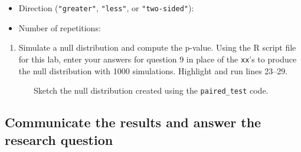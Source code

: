 \documentclass[
]{report}
\newenvironment{Shaded}{\begin{snugshade}}{\end{snugshade}}
\newcommand{\AttributeTok}[1]{\textcolor[rgb]{0.13,0.29,0.53}{#1}}
\newcommand{\CommentTok}[1]{\textcolor[rgb]{0.56,0.35,0.01}{\textit{#1}}}
\newcommand{\DecValTok}[1]{\textcolor[rgb]{0.00,0.00,0.81}{#1}}
\newcommand{\FunctionTok}[1]{\textcolor[rgb]{0.13,0.29,0.53}{\textbf{#1}}}
\newcommand{\NormalTok}[1]{#1}
\newcommand{\SpecialCharTok}[1]{\textcolor[rgb]{0.81,0.36,0.00}{\textbf{#1}}}
\newcommand{\StringTok}[1]{\textcolor[rgb]{0.31,0.60,0.02}{#1}}
\providecommand{\tightlist}{%
  \setlength{\itemsep}{0pt}\setlength{\parskip}{0pt}}
\begin{document}
\begin{itemize}
\tightlist
\item
  Direction (\texttt{"greater"}, \texttt{"less"}, or \texttt{"two-sided"}):
\end{itemize}

\vspace{.1in}

\begin{itemize}
\tightlist
\item
  Number of repetitions:
\end{itemize}

\vspace{.1in}

\begin{enumerate}
\def\labelenumi{\arabic{enumi}.}
\setcounter{enumi}{9}
\tightlist
\item
  Simulate a null distribution and compute the p-value. Using the R script file for this lab, enter your answers for question 9 in place of the \texttt{xx}'s to produce the null distribution with 1000 simulations. Highlight and run lines 23--29.
\end{enumerate}

\begin{Shaded}
\end{Shaded}

~~~~~~~Sketch the null distribution created using the \texttt{paired\_test} code.

\vspace{1.5in}

\subsection*{Communicate the results and answer the research question}\label{communicate-the-results-and-answer-the-research-question}
\end{document}

